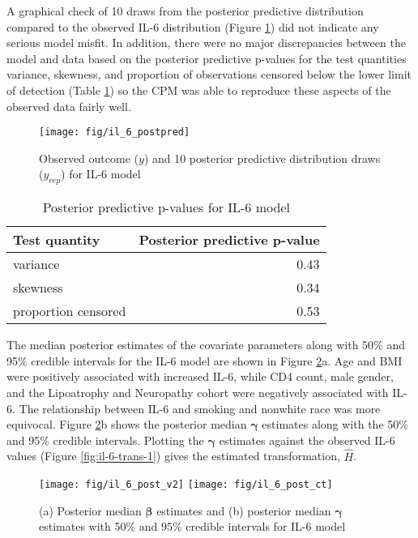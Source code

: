 \documentclass[
]{article}
\begin{document}
A graphical check of 10 draws from the posterior predictive distribution compared to the observed IL-6 distribution (Figure \ref{fig:il6-postpred}) did not indicate any serious model misfit. In addition, there were no major discrepancies between the model and data based on the posterior predictive p-values for the test quantities variance, skewness, and proportion of observations censored below the lower limit of detection (Table \ref{tab:ppptab1}) so the CPM was able to reproduce these aspects of the observed data fairly well.

\begin{figure}

{\centering \texttt{[image: fig/il\_6\_postpred]} 

}

\caption{Observed outcome ($y$) and 10 posterior predictive distribution draws ($y_{rep}$) for IL-6 model}\label{fig:il6-postpred}
\end{figure}

\begin{table}[!h]

\caption{\label{tab:ppptab1}Posterior predictive p-values for IL-6 model}
\centering
\begin{tabular}[t]{lr}
\toprule
Test quantity & Posterior predictive p-value\\
\midrule
variance & 0.43\\
skewness & 0.34\\
proportion censored & 0.53\\
\bottomrule
\end{tabular}
\end{table}

The median posterior estimates of the covariate parameters along with 50\% and 95\% credible intervals for the IL-6 model are shown in Figure \ref{fig:il6-par00}a. Age and BMI were positively associated with increased IL-6, while CD4 count, male gender, and the Lipoatrophy and Neuropathy cohort were negatively associated with IL-6. The relationship between IL-6 and smoking and nonwhite race was more equivocal. Figure \ref{fig:il6-par00}b shows the posterior median \(\boldsymbol{\gamma}\) estimates along with the 50\% and 95\% credible intervals. Plotting the \(\boldsymbol{\gamma}\) estimates against the observed IL-6 values (Figure \ref{fig:il-6-trans-1}) gives the estimated transformation, \(\hat{H}\).

\begin{figure}

{\centering \texttt{[image: fig/il\_6\_post\_v2]} \texttt{[image: fig/il\_6\_post\_ct]} 

}

\caption{(a) Posterior median $\boldsymbol{\beta}$ estimates and (b) posterior median $\boldsymbol{\gamma}$ estimates with 50\% and 95\% credible intervals for IL-6 model}\label{fig:il6-par00}
\end{figure}
\end{document}
